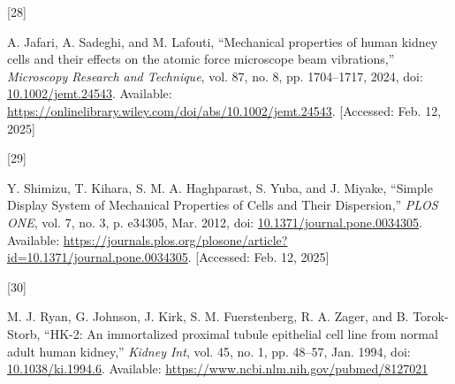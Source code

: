 \documentclass[
  paper=a4,
  ,captions=tableheading
]{scrartcl}
\newlength{\cslhangindent}
\newlength{\csllabelwidth}
\newenvironment{CSLReferences}[2] %
  {\begin{list}{}{%
   \setlength{\itemindent}{0pt}
   \setlength{\leftmargin}{0pt}
   \setlength{\parsep}{0pt}
   \ifodd #1
    \setlength{\leftmargin}{\cslhangindent}
    \setlength{\itemindent}{-1\cslhangindent}
   \fi
   \setlength{\itemsep}{#2\baselineskip}}}
  {\end{list}}
\newcommand{\CSLLeftMargin}[1]{\parbox[t]{\csllabelwidth}{\strut#1\strut}}
\newcommand{\CSLRightInline}[1]{\parbox[t]{\linewidth - \csllabelwidth}{\strut#1\strut}}
\begin{document}
\begin{CSLReferences}{0}{0}
\CSLLeftMargin{{[}28{]} }%
\CSLRightInline{A. Jafari, A. Sadeghi, and M. Lafouti, {``Mechanical
properties of human kidney cells and their effects on the atomic force
microscope beam vibrations,''} \emph{Microscopy Research and Technique},
vol. 87, no. 8, pp. 1704--1717, 2024, doi:
\href{https://doi.org/10.1002/jemt.24543}{10.1002/jemt.24543}.
Available:
\url{https://onlinelibrary.wiley.com/doi/abs/10.1002/jemt.24543}.
{[}Accessed: Feb. 12, 2025{]}}

\CSLLeftMargin{{[}29{]} }%
\CSLRightInline{Y. Shimizu, T. Kihara, S. M. A. Haghparast, S. Yuba, and
J. Miyake, {``Simple {Display System} of {Mechanical Properties} of
{Cells} and {Their Dispersion},''} \emph{PLOS ONE}, vol. 7, no. 3, p.
e34305, Mar. 2012, doi:
\href{https://doi.org/10.1371/journal.pone.0034305}{10.1371/journal.pone.0034305}.
Available:
\url{https://journals.plos.org/plosone/article?id=10.1371/journal.pone.0034305}.
{[}Accessed: Feb. 12, 2025{]}}

\CSLLeftMargin{{[}30{]} }%
\CSLRightInline{M. J. Ryan, G. Johnson, J. Kirk, S. M. Fuerstenberg, R.
A. Zager, and B. Torok-Storb, {``{HK-2}: An immortalized proximal tubule
epithelial cell line from normal adult human kidney,''} \emph{Kidney
Int}, vol. 45, no. 1, pp. 48--57, Jan. 1994, doi:
\href{https://doi.org/10.1038/ki.1994.6}{10.1038/ki.1994.6}. Available:
\url{https://www.ncbi.nlm.nih.gov/pubmed/8127021}}

\end{CSLReferences}
\end{document}
